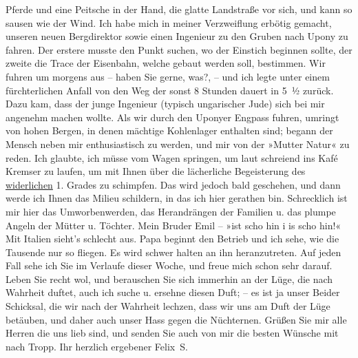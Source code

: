 \begin{ledgroupsized}[t]{13cm}
               Pferde und eine Peitsche in der Hand, die glatte Landstraße vor sich, und kann so
               sausen wie der Wind. Ich habe mich in meiner Verzweiflung erbötig gemacht, unseren
               neuen Bergdirektor sowie einen Ingenieur  zu den Gruben nach Upony zu fahren. Der erstere musste den Punkt
               suchen, wo der Einstich beginnen sollte, der zweite die Trace der Eisenbahn, welche
               gebaut werden soll, bestimmen. Wir fuhren um 
               morgens aus – haben Sie gerne, was?, – und ich legte unter einem fürchterlichen
               Anfall von \label{K_L03105-11v}\label{K_L03105-11h} den Weg der sonst 8 Stunden
               dauert in 5 ½ zurück. Dazu kam, dass der junge Ingenieur (typisch ungarischer Jude) sich bei mir angenehm
               machen wollte. Als wir durch den Uponyer
                  Engpass fuhren, umringt von hohen Bergen, in denen mächtige Kohlenlager
               enthalten sind; be{\pb}gann der
               Mensch neben mir enthusiastisch zu werden, und mir von der »Mutter Natur« zu reden.
               Ich glaubte, ich müsse vom Wagen springen, um laut schreiend ins Kafé Kremser zu laufen, um mit Ihnen über die lächerliche
               Begeisterung des \uline{widerlichen} 1. Grades zu schimpfen.
               Das wird jedoch bald geschehen, und dann werde ich Ihnen das Milieu schildern, in das
               ich hier gerathen bin. Schrecklich ist mir hier das Umworbenwerden, das Herandrängen
               der Familien u. das plumpe Angeln der Mütter u. Töchter. Mein Bruder Emil – »ist scho hin i is scho hin!«\pend
           \pstart
           Mit Italien sieht's schlecht aus. Papa beginnt den Betrieb und ich sehe, wie die
               Tausende nur so fliegen. Es wird schwer halten an ihn heranzutreten. Auf jeden Fall
               sehe ich Sie im Verlaufe dieser Woche, und freue mich schon sehr darauf. \pend
           \pstart
           Leben Sie recht wol, und berauschen Sie sich immerhin an der Lüge, die nach Wahrheit
               duftet, auch ich suche u. ersehne diesen Duft; – es ist ja unser Beider Schicksal,
               die wir nach der Wahrheit lechzen, dass wir uns am Duft der Lüge betäuben, und daher
               auch unser Hass gegen die Nüchternen. \pend
           \pstart
           Grüßen Sie mir alle Herren die uns lieb sind, und senden Sie auch von mir die besten
               Wünsche mit nach Tropp. \pend
           \pstart  Ihr herzlich ergebener \spacefill\mbox{Felix S.}\pend{}
         

\end{ledgroupsized}
